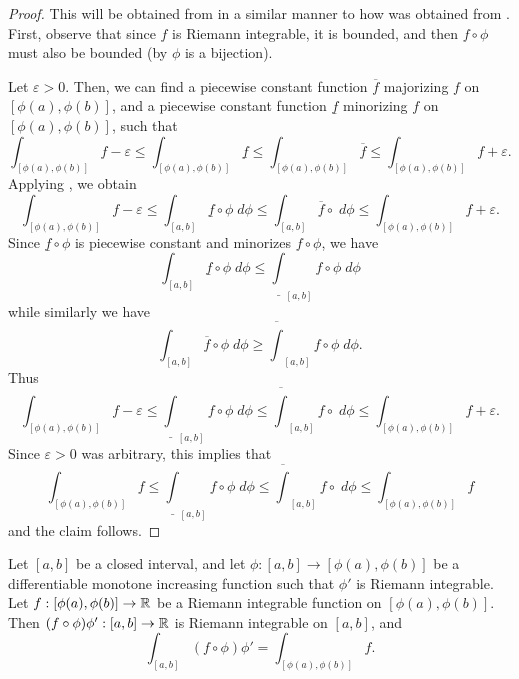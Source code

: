 \begin{proof}
  This will be obtained from  in a similar manner to how  was obtained from .
  First, observe that since \(f\) is Riemann integrable, it is bounded, and then \(f \circ \phi\) must also be bounded (by  \(\phi\) is a bijection).

  Let \(\varepsilon > 0\).
  Then, we can find a piecewise constant function \(\overline{f}\) majorizing \(f\) on \([\phi(a), \phi(b)]\), and a piecewise constant function \(\underline{f}\) minorizing \(f\) on \([\phi(a), \phi(b)]\), such that
  \[
    \int_{[\phi(a), \phi(b)]} f - \varepsilon \leq \int_{[\phi(a), \phi(b)]} \underline{f} \leq \int_{[\phi(a), \phi(b)]} \overline{f} \leq \int_{[\phi(a), \phi(b)]} f + \varepsilon.
  \]
  Applying , we obtain
  \[
    \int_{[\phi(a), \phi(b)]} f - \varepsilon \leq \int_{[a, b]} \underline{f} \circ \phi \; d \phi \leq \int_{[a, b]} \overline{f} \circ \; d \phi \leq \int_{[\phi(a), \phi(b)]} f + \varepsilon.
  \]
  Since \(\underline{f} \circ \phi\) is piecewise constant and minorizes \(f \circ \phi\), we have
  \[
    \int_{[a, b]} \underline{f} \circ \phi \; d \phi \leq \underline{\int}_{[a, b]} f \circ \phi \; d \phi
  \]
  while similarly we have
  \[
    \int_{[a, b]} \overline{f} \circ \phi \; d \phi \geq \overline{\int}_{[a, b]} f \circ \phi \; d \phi.
  \]
  Thus
  \[
    \int_{[\phi(a), \phi(b)]} f - \varepsilon \leq \underline{\int}_{[a, b]} f \circ \phi \; d \phi \leq \overline{\int}_{[a, b]} f \circ \; d \phi \leq \int_{[\phi(a), \phi(b)]} f + \varepsilon.
  \]
  Since \(\varepsilon > 0\) was arbitrary, this implies that
  \[
    \int_{[\phi(a), \phi(b)]} f \leq \underline{\int}_{[a, b]} f \circ \phi \; d \phi \leq \overline{\int}_{[a, b]} f \circ \; d \phi \leq \int_{[\phi(a), \phi(b)]} f
  \]
  and the claim follows.
\end{proof}

\begin{prop}\label{i:11.10.7}
  Let \([a, b]\) be a closed interval, and let \(\phi : [a, b] \to [\phi(a), \phi(b)]\) be a differentiable monotone increasing function such that \(\phi'\) is Riemann integrable.
  Let \(f : [\phi(a), \phi(b)] \to \mathbb{R}\) be a Riemann integrable function on \([\phi(a), \phi(b)]\).
  Then \((f \circ \phi) \phi' : [a, b] \to \mathbb{R}\) is Riemann integrable on \([a, b]\), and
  \[
    \int_{[a, b]} (f \circ \phi) \phi' = \int_{[\phi(a), \phi(b)]} f.
  \]
\end{prop}

